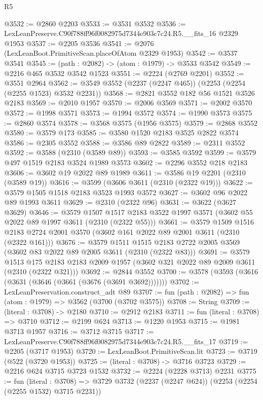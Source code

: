 \begin{lexlean}{R5}
\begin{coremodule}
@3532 := @2860 @2203
@3533 := @3531 @3532
@3536 := LexLeanPreserve.C90f788ff96f0082975d7344e903c7c24.R5.__fits_16 @2329 @1953
@3537 := @2205 @3536
@3541 := @2076 (LexLeanBoot.PrimitiveScan.placeOfAtom @2329 @1953)
@3542 := @3537 @3541
@3545 := (path : @2082) -> (atom : @1979) -> @3533 @3542
@3549 := @2216 @465 @3532 @3542 @1523
@3551 := @2224 (@2769 @2201)
@3552 := @3551 @2964
@3562 := @3549 @3552 (@2237 (@2247 @465)) (@2253 (@2254 (@2255 @1523) @3532 @2231))
@3568 := @2821 @3552 @182 @56 @1521 @3526 @2183
@3569 := @2010 @1957
@3570 := @2006 @3569
@3571 := @2002 @3570
@3572 := @1998 @3571
@3573 := @1994 @3572
@3574 := @1990 @3573
@3575 := @2860 @3574
@3578 := @3568 @3575 (@1956 @3575)
@3579 := @2868 @3552
@3580 := @3579 @173
@3585 := @3580 @1520 @2183 @3525 @2822 @3574
@3586 := @2305 @3552
@3588 := @3586 @89 @2822
@3589 := @2311 @3552
@3592 := @3588 (@2310 (@3589 @89))
@3593 := @3585 @3592
@3599 := @3579 @497 @1519 @2183 @3524 @1989 @3573
@3602 := @2296 @3552 @218 @2183
@3606 := @3602 @19 @2022 @89 @1989
@3611 := @3586 @19 @2201 (@2310 (@3589 @19))
@3616 := @3599 (@3606 @3611 (@2310 (@2322 @19)))
@3622 := @3579 @1505 @1518 @2183 @3523 @1993 @3572
@3627 := @3602 @96 @2022 @89 @1993 @3611
@3629 := @2310 (@2322 @96)
@3631 := @3622 (@3627 @3629)
@3646 := @3579
    @1507
    @1517
    @2183
    @3522
    @1997
    @3571
    (@3602 @55 @2022 @89 @1997 @3611 (@2310 (@2322 @55)))
@3661 := @3579
    @1509
    @1516
    @2183
    @2724
    @2001
    @3570
    (@3602 @161 @2022 @89 @2001 @3611 (@2310 (@2322 @161)))
@3676 := @3579
    @1511
    @1515
    @2183
    @2722
    @2005
    @3569
    (@3602 @83 @2022 @89 @2005 @3611 (@2310 (@2322 @83)))
@3691 := @3579
    @1513
    @175
    @2183
    @2183
    @2009
    @1957
    (@3602 @321 @2022 @89 @2009 @3611 (@2310 (@2322 @321)))
@3692 := @2844 @3552
@3700 := @3578 (@3593 (@3616 (@3631 (@3646 (@3661 (@3676 (@3691 @3692)))))))
@3702 := LexLeanPreservation.construct_adt @89
@3707 := fun (path : @2082) => fun (atom : @1979) => @3562 (@3700 (@3702 @3575))
@3708 := String
@3709 := (literal : @3708) -> @2180
@3710 := @2912 @2183
@3711 := fun (literal : @3708) => @3710
@3712 := @2199 @624
@3713 := @1220 @1953
@3715 := @1981 @3713 @1957
@3716 := @3712 @3715
@3717 := LexLeanPreserve.C90f788ff96f0082975d7344e903c7c24.R5.__fits_17
@3719 := @2205 (@3717 @1953)
@3720 := LexLeanBoot.PrimitiveScan.lit
@3723 := @3719 (@522 (@3720 @1953))
@3725 := (literal : @3708) -> @3716 @3723
@3729 := @2216 @624 @3715 @3723 @1532
@3732 := @2224 (@2228 @3713) @2231
@3775 := fun (literal : @3708) =>
  @3729
    @3732
    (@2237 (@2247 @624))
    (@2253 (@2254 (@2255 @1532) @3715 @2231))

\end{coremodule}
\end{lexlean}
